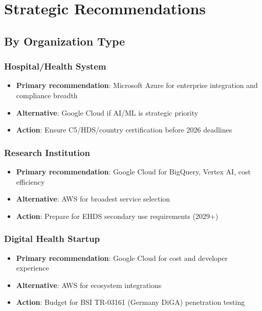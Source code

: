 \documentclass[11pt,a4paper]{article}
\begin{document}
\section{Strategic Recommendations}

\subsection{By Organization Type}

\subsubsection{Hospital/Health System}
\begin{itemize}
    \item \textbf{Primary recommendation}: Microsoft Azure for enterprise integration and compliance breadth
    \item \textbf{Alternative}: Google Cloud if AI/ML is strategic priority
    \item \textbf{Action}: Ensure C5/HDS/country certification before 2026 deadlines
\end{itemize}

\subsubsection{Research Institution}
\begin{itemize}
    \item \textbf{Primary recommendation}: Google Cloud for BigQuery, Vertex AI, cost efficiency
    \item \textbf{Alternative}: AWS for broadest service selection
    \item \textbf{Action}: Prepare for EHDS secondary use requirements (2029+)
\end{itemize}

\subsubsection{Digital Health Startup}
\begin{itemize}
    \item \textbf{Primary recommendation}: Google Cloud for cost and developer experience
    \item \textbf{Alternative}: AWS for ecosystem integrations
    \item \textbf{Action}: Budget for BSI TR-03161 (Germany DiGA) penetration testing
\end{itemize}
\end{document}
